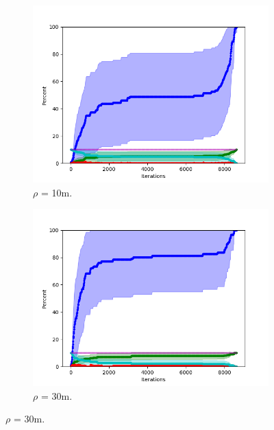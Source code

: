 \begin{figure}
\centering

\begin{subfigure}{0.5\textwidth}
\includegraphics[width=\linewidth]{images/plots/Network_rA_10.0/new_plots/10.png}
\caption{$\rho$ = 10m.} \label{fig:tarjan0}
\end{subfigure}

\begin{subfigure}{0.5\textwidth}
\includegraphics[width=\linewidth]{images/plots/Network_rA_10.0/new_plots/30.png}
\caption{$\rho$ = 30m.} \label{fig:tarjan0}
\end{subfigure}


\end{figure}
